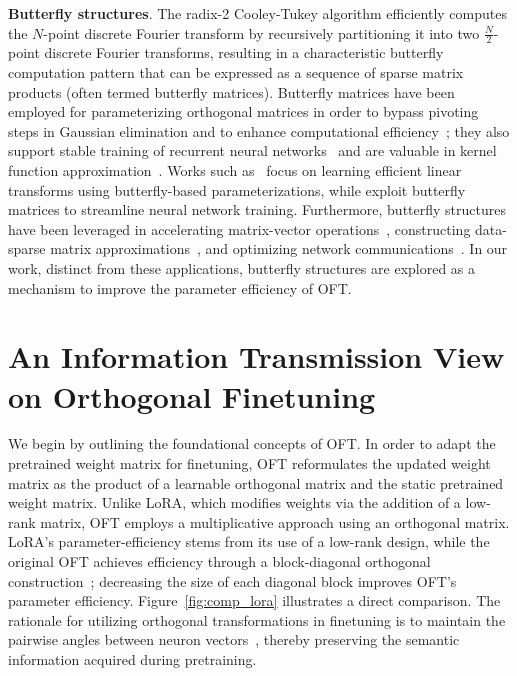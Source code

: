 \textbf{Butterfly structures}. The radix-2 Cooley-Tukey algorithm efficiently computes the $N$-point discrete Fourier transform by recursively partitioning it into two $\frac{N}{2}$-point discrete Fourier transforms, resulting in a characteristic butterfly computation pattern that can be expressed as a sequence of sparse matrix products (often termed butterfly matrices). Butterfly matrices have been employed for parameterizing orthogonal matrices in order to bypass pivoting steps in Gaussian elimination and to enhance computational efficiency~\cite{parker1995random}; they also support stable training of recurrent neural networks~\cite{jing2017tunable} and are valuable in kernel function approximation~\cite{munkhoeva2018quadrature}. Works such as~\cite{dao2019learning,dao2019kaleidoscope} focus on learning efficient linear transforms using butterfly-based parameterizations, while \cite{chen2022pixelated,dao2022monarch} exploit butterfly matrices to streamline neural network training. Furthermore, butterfly structures have been leveraged in accelerating matrix-vector operations~\cite{michielssen1996multilevel,o2010algorithm}, constructing data-sparse matrix approximations~\cite{li2015butterfly}, and optimizing network communications~\cite{klasing1994broadcasting,li2003linear,rajasingh2016transmission}. In our work, distinct from these applications, butterfly structures are explored as a mechanism to improve the parameter efficiency of OFT.

\section{An Information Transmission View on Orthogonal Finetuning}

We begin by outlining the foundational concepts of OFT. In order to adapt the pretrained weight matrix for finetuning, OFT reformulates the updated weight matrix as the product of a learnable orthogonal matrix and the static pretrained weight matrix. Unlike LoRA, which modifies weights via the addition of a low-rank matrix, OFT employs a multiplicative approach using an orthogonal matrix. LoRA’s parameter-efficiency stems from its use of a low-rank design, while the original OFT achieves efficiency through a block-diagonal orthogonal construction~\cite{qiu2023controlling}; decreasing the size of each diagonal block improves OFT’s parameter efficiency. Figure~\ref{fig:comp_lora} illustrates a direct comparison. The rationale for utilizing orthogonal transformations in finetuning is to maintain the pairwise angles between neuron vectors~\cite{liu2018learning,liu2021orthogonal,qiu2023controlling}, thereby preserving the semantic information acquired during pretraining. 

